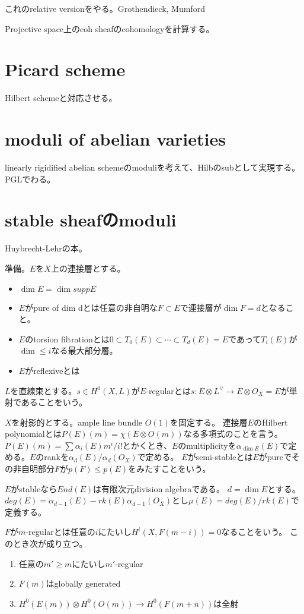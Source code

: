 \documentclass{jsarticle}
\begin{document}
これのrelative versionをやる。Grothendieck, Mumford

Projective space上のcoh sheafのcohomologyを計算する。

\section{Picard scheme}
Hilbert schemeと対応させる。

\section{moduli of abelian varieties}
linearly rigidified abelian schemeのmoduliを考えて、Hilbのsubとして実現する。
PGLでわる。

\section{stable sheafのmoduli}
Huybrecht-Lehrの本。

準備。$E$を$X$上の連接層とする。
\begin{itemize}
\item $\dim E=\dim supp E$
\item $E$がpure of dim dとは任意の非自明な$F\subset E$で連接層が$\dim F=d$となること。
\item $E$のtorsion filtrationとは$0\subset T_0(E)\subset\cdots\subset T_d(E)=E$であって$T_i(E)$が$\dim \leq i$なる最大部分層。
\item $E$がreflexiveとは
\end{itemize}

$L$を直線束とする。$s\in H^0(X, L)$が$E$-regularとは$s:E\otimes L^{\vee}\to E\otimes O_X=E$が単射であることをいう。

$X$を射影的とする。ample line bundle $O(1)$を固定する。
連接層$E$のHilbert polynomialとは$P(E)(m)=\chi(E\otimes O(m))$なる多項式のことを言う。
$P(E)(m)=\sum\alpha_i(E)m^i/i!$とかくとき、$E$のmultiplicityを$\alpha_{\dim E}(E)$で定める。$E$のrankを$\alpha_d(E)/\alpha_d(O_X)$で定める。
$E$がsemi-stableとは$E$がpureでその非自明部分$F$が$p(F)\leq p(E)$をみたすことをいう。

$E$がstableなら$End(E)$は有限次元division algebraである。
$d=\dim E$とする。
$deg(E)=\alpha_{d-1}(E)-rk(E)\alpha_{d-1}(O_X)$とし$\mu(E)=deg(E)/rk(E)$で定義する。

$F$が$m$-regularとは任意の$i$にたいし$H^i(X, F(m-i))=0$なることをいう。
このとき次が成り立つ。
\begin{enumerate}
\item 任意の$m'\geq m$にたいし$m'$-regular
\item $F(m)$はglobally generated
\item $H^0(E(m))\otimes H^0(O(m))\to H^0(F(m+n))$は全射
\end{enumerate}
\end{document}
